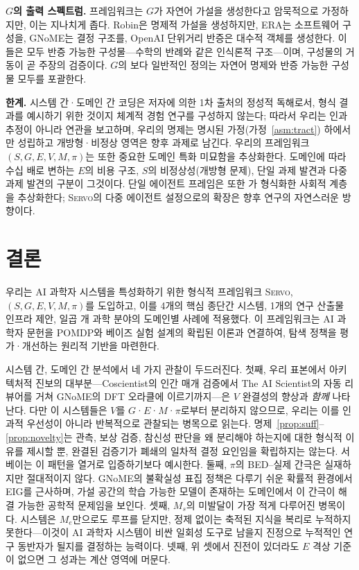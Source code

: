 \documentclass[11pt]{article}
\newcommand{\sgmvpi}{$(S, G, E, V, M, \pi)$}
\newcommand{\framework}{\textsc{Servo}}
\begin{document}
\textbf{$G$의 출력 스펙트럼.} 프레임워크는 $G$가 자연어 가설을 생성한다고 암묵적으로 가정하지만, 이는 지나치게 좁다. Robin은 명제적 가설을 생성하지만, ERA는 소프트웨어 구성을, GNoME는 결정 구조를, OpenAI 단위거리 반증은 대수적 객체를 생성한다. 이들은 모두 반증 가능한 구성물---수학의 반례와 같은 인식론적 구조---이며, 구성물의 거동이 곧 주장의 검증이다. $G$의 보다 일반적인 정의는 자연어 명제와 반증 가능한 구성물 모두를 포괄한다.

\textbf{한계.} 시스템 간·도메인 간 코딩은 저자에 의한 1차 출처의 정성적 독해로서, 형식 결과를 예시하기 위한 것이지 체계적 경험 연구를 구성하지 않는다; 따라서 우리는 인과 추정이 아니라 연관을 보고하며, 우리의 명제는 명시된 가정(가정~\ref{asm:tract}) 하에서만 성립하고 개방형·비정상 영역은 향후 과제로 남긴다. 우리의 프레임워크 \sgmvpi{}는 또한 중요한 도메인 특화 미묘함을 추상화한다. 도메인에 따라 수십 배로 변하는 $E$의 비용 구조, $S$의 비정상성(개방형 문제), 단일 과제 발견과 다중 과제 발견의 구분이 그것이다. 단일 에이전트 프레임은 또한 \citet{taniguchi2024cpc}가 형식화한 사회적 계층을 추상화한다; \framework{}의 다중 에이전트 설정으로의 확장은 향후 연구의 자연스러운 방향이다.

\section{결론}
\label{sec:conclusion}

우리는 AI 과학자 시스템을 특성화하기 위한 형식적 프레임워크 \framework{}, \sgmvpi{}를 도입하고, 이를 4개의 핵심 종단간 시스템, 1개의 연구 산출물 인프라 제안, 일곱 개 과학 분야의 도메인별 사례에 적용했다. 이 프레임워크는 AI 과학자 문헌을 POMDP와 베이즈 실험 설계의 확립된 이론과 연결하여, 탐색 정책을 평가·개선하는 원리적 기반을 마련한다.

시스템 간, 도메인 간 분석에서 네 가지 관찰이 두드러진다. 첫째, 우리 표본에서 아키텍처적 진보의 대부분---Coscientist의 인간 매개 검증에서 The AI Scientist의 자동 리뷰어를 거쳐 GNoME의 DFT 오라클에 이르기까지---은 $V$ 완결성의 향상과 \emph{함께} 나타난다. 다만 이 시스템들은 $V$를 $G$·$E$·$M$·$\pi$로부터 분리하지 않으므로, 우리는 이를 인과적 우선성이 아니라 반복적으로 관찰되는 병목으로 읽는다. 명제~\ref{prop:suff}--\ref{prop:novelty}는 관측, 보상 검증, 참신성 판단을 왜 분리해야 하는지에 대한 형식적 이유를 제시할 뿐, 완결된 검증기가 폐쇄의 일차적 결정 요인임을 확립하지는 않는다. 서베이는 이 패턴을 열거로 입증하기보다 예시한다. 둘째, $\pi$의 BED--실제 간극은 실재하지만 절대적이지 않다. GNoME의 불확실성 표집 정책은 다루기 쉬운 확률적 환경에서 EIG를 근사하며, 가설 공간의 학습 가능한 모델이 존재하는 도메인에서 이 간극이 해결 가능한 공학적 문제임을 보인다. 셋째, $M_s$의 미발달이 가장 적게 다루어진 병목이다. 시스템은 $M_e$만으로도 루프를 닫지만, 정제 없이는 축적된 지식을 복리로 누적하지 못한다---이것이 AI 과학자 시스템이 비싼 일회성 도구로 남을지 진정으로 누적적인 연구 동반자가 될지를 결정하는 능력이다. 넷째, 위 셋에서 진전이 있더라도 $E$ 격상 기준이 없으면 그 성과는 계산 영역에 머문다.
\end{document}
